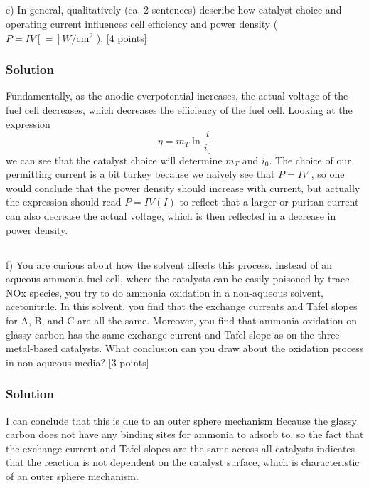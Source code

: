 \documentclass[12pt]{article}
\begin{document}
\subsection{}
e) In general, qualitatively (ca. 2 sentences) describe how catalyst choice and operating current influences cell efficiency and power density ( $P=I V[=] W / \mathrm{cm}^{2}$ ). [4 points]\\[0pt]
\subsubsection{Solution}
Fundamentally, as the anodic overpotential increases, the actual voltage of the fuel cell decreases, which decreases the efficiency of the fuel cell. Looking at the expression
\begin{equation}
    \eta=m_T \ln \frac{i}{i_0}
\end{equation}
we can see that the catalyst choice will determine $m_T$ and $i_0$. The choice of our permitting current is a bit turkey because we naively see that $P=I V$ , so one would conclude that the power density should increase with current, but actually the expression should read $P=IV(I)$ to reflect that a larger or puritan current can also decrease the actual voltage, which is then reflected in a decrease in power density.
\subsection{}
f) You are curious about how the solvent affects this process. Instead of an aqueous ammonia fuel cell, where the catalysts can be easily poisoned by trace NOx species, you try to do ammonia oxidation in a non-aqueous solvent, acetonitrile. In this solvent, you find that the exchange currents and Tafel slopes for A, B, and C are all the same. Moreover, you find that ammonia oxidation on glassy carbon has the same exchange current and Tafel slope as on the three metal-based catalysts. What conclusion can you draw about the oxidation process in non-aqueous media? [3 points]
\subsubsection{Solution}
I can conclude that this is due to an outer sphere mechanism Because the glassy carbon does not have any binding sites for ammonia to adsorb to, so the fact that the exchange current and Tafel slopes are the same across all catalysts indicates that the reaction is not dependent on the catalyst surface, which is characteristic of an outer sphere mechanism.
\end{document}
